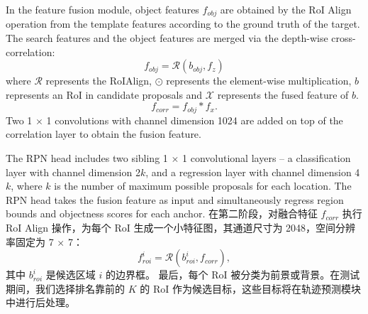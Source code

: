 In the feature fusion module, object features $f_{obj}$ are obtained by the RoI Align operation from the template features according to the ground truth of the target. The search features and the object features are merged via the depth-wise cross-correlation:
\begin{equation}
    f_{obj} = \mathcal{R}(b_{obj}, f_{z})
\end{equation}
where $\mathcal{R}$ represents the RoIAlign, $\odot$ represents the element-wise multiplication, $b$ represents an RoI in candidate proposals and $\mathcal{X}$ represents the fused feature of $b$.
\begin{equation}
    f_{corr} = f_{obj} * f_{x}.
\end{equation}
Two 1 $\times$ 1 convolutions with channel dimension 1024 are added on top of the correlation layer to obtain the fusion feature.

The RPN head includes two sibling 1 $\times$ 1 convolutional layers -- a classification layer with channel dimension 2$k$, and a regression layer with channel dimension 4$k$, where $k$ is the number of maximum possible proposals for each location. The RPN head takes the fusion feature as input and simultaneously regress region bounds and objectness scores for each anchor.
\fi
在第二阶段，对融合特征 $f_{corr}$ 执行 RoI Align 操作，为每个 RoI 生成一个小特征图，其通道尺寸为 2048，空间分辨率固定为 7 $\times$ 7：
\begin{equation}
    f_{roi}^{i} = \mathcal{R}(b_{roi}^{i}, f_{corr}),
\end{equation}
其中 $b_{roi}^{i}$ 是候选区域 $i$ 的边界框。
最后，每个 RoI 被分类为前景或背景。在测试期间，我们选择排名靠前的 $K$ 的 RoI 作为候选目标，这些目标将在轨迹预测模块中进行后处理。

